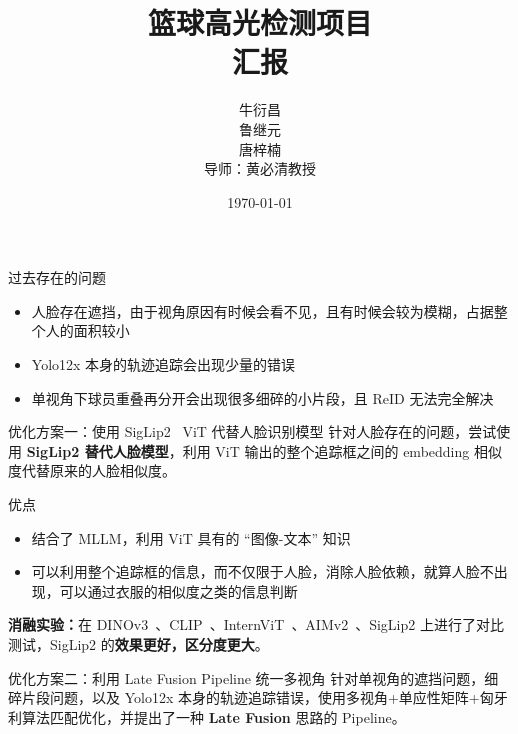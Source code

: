 \documentclass{ctexbeamer}
\title[篮球高光检测]{篮球高光检测项目\\[2mm] 汇报}
\author[唐梓楠]{牛衍昌\\鲁继元\\唐梓楠\\[5mm] 导师：黄必清教授}
\institute[清华大学]{\small 清华大学}
\date{\small \vskip -10pt \today}
\begin{document}
\begin{frame}
  \maketitle
\end{frame}


\begin{frame}{过去存在的问题}
  \begin{itemize}
    \item 人脸存在遮挡，由于视角原因有时候会看不见，且有时候会较为模糊，占据整个人的面积较小
    \item Yolo12x 本身的轨迹追踪会出现少量的错误
    \item 单视角下球员重叠再分开会出现很多细碎的小片段，且 ReID 无法完全解决
  \end{itemize}
\end{frame}

\begin{frame}{优化方案一：使用 SigLip2~\cite{tschannen2025siglip2multilingualvisionlanguage} ViT 代替人脸识别模型}
  针对人脸存在的问题，尝试使用 \textbf{SigLip2 替代人脸模型}，利用 ViT 输出的整个追踪框之间的 embedding 相似度代替原来的人脸相似度。
  
  \begin{block}{优点}
    \begin{itemize}
      \item 结合了 MLLM，利用 ViT 具有的 ``图像-文本'' 知识
      \item 可以利用整个追踪框的信息，而不仅限于人脸，消除人脸依赖，就算人脸不出现，可以通过衣服的相似度之类的信息判断
    \end{itemize}
  \end{block}

  \textbf{消融实验：}在 DINOv3~\cite{siméoni2025dinov3}、CLIP~\cite{radford2021learningtransferablevisualmodels}、InternViT~\cite{10656429}、AIMv2~\cite{fini2024multimodalautoregressivepretraininglarge}、SigLip2 上进行了对比测试，SigLip2 的\textbf{效果更好，区分度更大}。
\end{frame}

\begin{frame}{优化方案二：利用 Late Fusion Pipeline 统一多视角}
  针对单视角的遮挡问题，细碎片段问题，以及 Yolo12x 本身的轨迹追踪错误，使用多视角+单应性矩阵+匈牙利算法匹配优化，并提出了一种 \textbf{Late Fusion} 思路的 Pipeline。
\end{frame}
\end{document}
